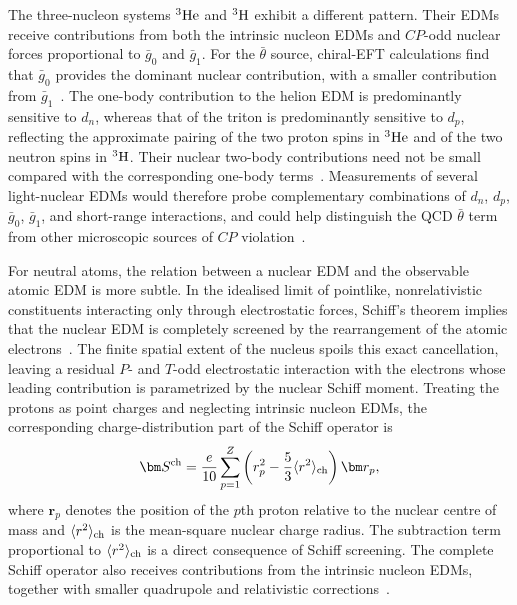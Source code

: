\documentclass[review]{elsarticle}
\numberwithin{equation}{section}
\numberwithin{table}{section}
\numberwithin{figure}{section}
\begin{document}
The three-nucleon systems $^3{\rm He}$ and $^3{\rm H}$ exhibit a different pattern. Their EDMs receive contributions from both the intrinsic nucleon EDMs and $CP$-odd nuclear forces proportional to $\bar g_0$ and $\bar g_1$. For the $\bar\theta$ source, chiral-EFT calculations find that $\bar g_0$ provides the dominant nuclear contribution, with a smaller contribution from $\bar g_1$~\cite{Dekens:2014jka,Bsaisou:2014oka}. The one-body contribution to the helion EDM is predominantly sensitive to $d_n$, whereas that of the triton is predominantly sensitive to $d_p$, reflecting the approximate pairing of the two proton spins in $^3{\rm He}$ and of the two neutron spins in $^3{\rm H}$. Their nuclear two-body contributions need not be small compared with the corresponding one-body terms~\cite{Dekens:2014jka,Bsaisou:2014oka}. Measurements of several light-nuclear EDMs would therefore probe complementary combinations of $d_n$, $d_p$, $\bar g_0$, $\bar g_1$, and short-range interactions, and could help distinguish the QCD $\bar\theta$ term from other microscopic sources of $CP$ violation~\cite{Dekens:2014jka,Bsaisou:2014oka,Yamanaka:2016umw}.

For neutral atoms, the relation between a nuclear EDM and the observable atomic EDM is more subtle. In the idealised limit of pointlike, nonrelativistic constituents interacting only through electrostatic forces, Schiff's theorem implies that the nuclear EDM is completely screened by the rearrangement of the atomic electrons~\cite{Engel:2013lsa,Chupp:2017rkp,Engel:2025uci}. The finite spatial extent of the nucleus spoils this exact cancellation, leaving a residual $P$- and $T$-odd electrostatic interaction with the electrons whose leading contribution is parametrized by the nuclear Schiff moment. Treating the protons as point charges and neglecting intrinsic nucleon EDMs, the corresponding charge-distribution part of the Schiff operator is~\cite{Engel:2025uci}
\begin{align}
    \bm S^{\rm ch}
    = \frac{e}{10} \sum_{p=1}^{Z}
    \left(r_p^2-\frac{5}{3}\langle r^2\rangle_{\rm ch}
    \right) \bm r_p ,
    \label{eq:Schiff-moment-schematic}
\end{align}
where $\bm r_p$ denotes the position of the $p$th proton relative to the nuclear centre of mass and $\langle r^2\rangle_{\rm ch}$ is the mean-square nuclear charge radius. The subtraction term proportional to $\langle r^2\rangle_{\rm ch}$ is a direct consequence of Schiff screening. The complete Schiff operator also receives contributions from the intrinsic nucleon EDMs, together with smaller quadrupole and relativistic corrections~\cite{Engel:2025uci}.
\end{document}
